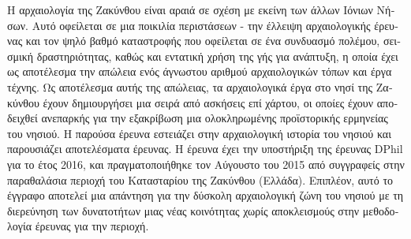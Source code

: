 \myseparator
\begin{myabstract}
\foreignlanguage{greek}{Η αρχαιολογία της Ζακύνθου είναι αραιά σε σχέση με εκείνη των άλλων Ιόνιων Νήσων. Αυτό οφείλεται σε μια ποικιλία περιστάσεων - την έλλειψη αρχαιολογικής έρευνας και τον ψηλό βαθμό καταστροφής που οφείλεται σε ένα συνδυασμό πολέμου, σεισμική δραστηριότητας, καθώς και εντατική χρήση της γής για ανάπτυξη, η οποία έχει ως αποτέλεσμα την απώλεια ενός άγνωστου αριθμού αρχαιολογικών τόπων και έργα τέχνης. Ως αποτέλεσμα αυτής της απώλειας, τα αρχαιολογικά έργα στο νησί της Ζακύνθου έχουν δημιουργήσει μια σειρά από ασκήσεις επί χάρτου, οι οποίες έχουν αποδειχθεί ανεπαρκής για την εξακρίβωση μια ολοκληρωμένης προϊστορικής ερμηνείας του νησιού. Η παρούσα έρευνα εστειάζει στην αρχαιολογική ιστορία του νησιού και παρουσιάζει αποτελέσματα έρευνας. Η έρευνα έχει την υποστήριξη της έρευνας DPhil για το έτος 2016, και πραγματοποιήθηκε τον Αύγουστο του 2015 από συγγραφείς στην παραθαλάσια περιοχή του Κατασταρίου της Ζακύνθου (Ελλάδα). Επιπλέον, αυτό το έγγραφο αποτελεί μια απάντηση για την δύσκολη αρχαιολογική ζώνη του νησιού με τη διερεύνηση των δυνατοτήτων μιας νέας κοινότητας χωρίς αποκλεισμούς στην μεθοδολογία έρευνας για την περιοχή.}

\end{myabstract}
\printbibliography[heading=subbibnumbered] 
\label{Takkou:lastpage}
\closingarticle
